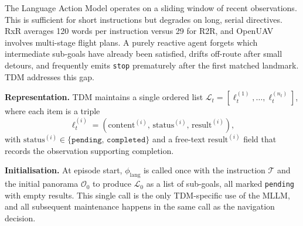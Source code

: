 \documentclass[conference]{IEEEtran}
\begin{document}
The Language Action Model operates on a sliding window of recent observations.
This is sufficient for short instructions but degrades on long, serial
directives. RxR averages 120 words per instruction versus 29 for R2R, and
OpenUAV involves multi-stage flight plans. A purely reactive agent forgets
which intermediate sub-goals have already been satisfied, drifts off-route
after small detours, and frequently emits \texttt{stop} prematurely after the
first matched landmark. TDM addresses this gap.

\textbf{Representation.} TDM maintains a single ordered list $\mathcal{L}_t =
[\ell_t^{(1)}, \ldots, \ell_t^{(n_t)}]$, where each item is a triple
\begin{equation}
\ell_t^{(i)} = (\mathrm{content}^{(i)},\,\mathrm{status}^{(i)},\,
\mathrm{result}^{(i)}),
\end{equation}
with $\mathrm{status}^{(i)} \in \{\texttt{pending},\,\texttt{completed}\}$ and
a free-text $\mathrm{result}^{(i)}$ field that records the observation
supporting completion.

\textbf{Initialisation.} At episode start, $\phi_{\mathrm{lang}}$ is called
once with the instruction $\mathcal{T}$ and the initial panorama
$\mathcal{O}_0$ to produce $\mathcal{L}_0$ as a list of sub-goals, all marked
\texttt{pending} with empty results. This single call is the only TDM-specific
use of the MLLM, and all subsequent maintenance happens in the same call as
the navigation decision.
\end{document}

